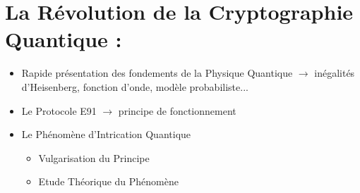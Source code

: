 \documentclass{article}
\begin{document}
\section{La Révolution de la Cryptographie Quantique :}

\begin{itemize}
    \item Rapide présentation des fondements de la Physique Quantique $\rightarrow$ inégalités d'Heisenberg, fonction d'onde, modèle probabiliste...
    \item Le Protocole E91 $\rightarrow$ principe de fonctionnement
    \item Le Phénomène d'Intrication Quantique
    \begin{itemize}
        \item Vulgarisation du Principe
        \item Etude Théorique du Phénomène
    \end{itemize}
\end{itemize}
\end{document}
